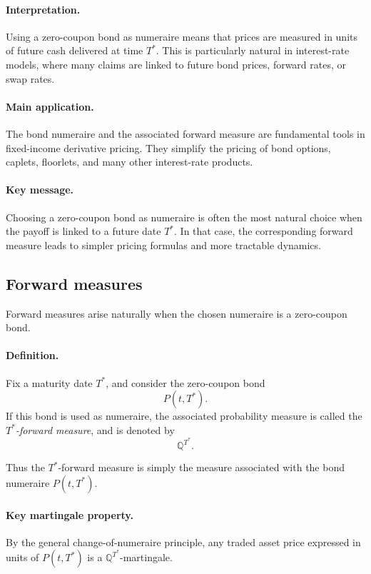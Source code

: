 \documentclass[11pt]{article}
\newcommand{\Qbb}{\mathbb{Q}}
\theoremstyle{definition}
\theoremstyle{plain}
\begin{document}
\paragraph{Interpretation.}
Using a zero-coupon bond as numeraire means that prices are measured in
units of future cash delivered at time \(T^\ast\).
This is particularly natural in interest-rate models, where many claims
are linked to future bond prices, forward rates, or swap rates.

\paragraph{Main application.}
The bond numeraire and the associated forward measure are fundamental
tools in fixed-income derivative pricing.
They simplify the pricing of bond options, caplets, floorlets, and many
other interest-rate products.

\paragraph{Key message.}
Choosing a zero-coupon bond as numeraire is often the most natural
choice when the payoff is linked to a future date \(T^\ast\).
In that case, the corresponding forward measure leads to simpler pricing
formulas and more tractable dynamics.


\subsection{Forward measures}

Forward measures arise naturally when the chosen numeraire is a
zero-coupon bond.

\paragraph{Definition.}
Fix a maturity date \(T^\ast\), and consider the zero-coupon bond
\[
P(t,T^\ast).
\]
If this bond is used as numeraire, the associated probability measure is
called the \emph{\(T^\ast\)-forward measure}, and is denoted by
\[
\Qbb^{T^\ast}.
\]

Thus the \(T^\ast\)-forward measure is simply the measure associated
with the bond numeraire \(P(t,T^\ast)\).

\paragraph{Key martingale property.}
By the general change-of-numeraire principle, any traded asset price
expressed in units of \(P(t,T^\ast)\) is a \(\Qbb^{T^\ast}\)-martingale.
\end{document}
